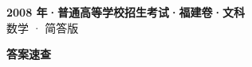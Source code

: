 \documentclass[zihao=-4, a4paper]{ctexart}
\begin{document}
\begin{center}
  {\Large\bfseries 2008 年·普通高等学校招生考试·福建卷·文科}\\[4pt]
  {\large 数学 · 简答版}
\end{center}
\medskip
{}

\clearpage
{}
\begin{center}{\Large\bfseries 答案速查}\end{center}
\medskip

\end{document}
